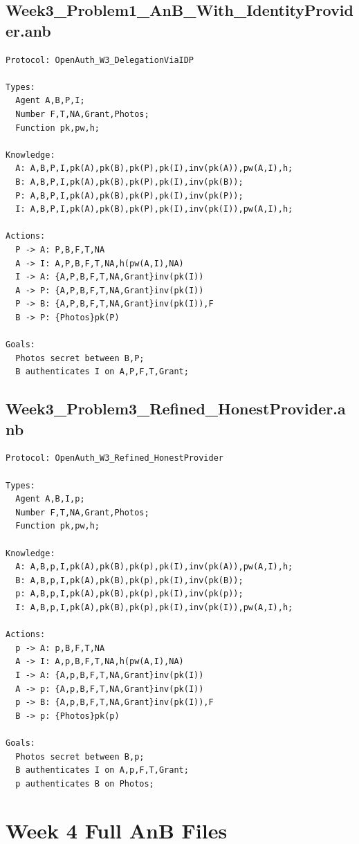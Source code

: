 \documentclass[11pt,a4paper]{article}
\begin{document}
\subsection{Week3\_Problem1\_AnB\_With\_IdentityProvider.anb}
\begin{lstlisting}[caption={Week 3 -- Initial IDP integration model},label={lst:week3-idp-full}]
Protocol: OpenAuth_W3_DelegationViaIDP

Types:
  Agent A,B,P,I;
  Number F,T,NA,Grant,Photos;
  Function pk,pw,h;

Knowledge:
  A: A,B,P,I,pk(A),pk(B),pk(P),pk(I),inv(pk(A)),pw(A,I),h;
  B: A,B,P,I,pk(A),pk(B),pk(P),pk(I),inv(pk(B));
  P: A,B,P,I,pk(A),pk(B),pk(P),pk(I),inv(pk(P));
  I: A,B,P,I,pk(A),pk(B),pk(P),pk(I),inv(pk(I)),pw(A,I),h;

Actions:
  P -> A: P,B,F,T,NA
  A -> I: A,P,B,F,T,NA,h(pw(A,I),NA)
  I -> A: {A,P,B,F,T,NA,Grant}inv(pk(I))
  A -> P: {A,P,B,F,T,NA,Grant}inv(pk(I))
  P -> B: {A,P,B,F,T,NA,Grant}inv(pk(I)),F
  B -> P: {Photos}pk(P)

Goals:
  Photos secret between B,P;
  B authenticates I on A,P,F,T,Grant;
\end{lstlisting}

\subsection{Week3\_Problem3\_Refined\_HonestProvider.anb}
\begin{lstlisting}[caption={Week 3 -- Refined honest-provider model},label={lst:week3-refined-full}]
Protocol: OpenAuth_W3_Refined_HonestProvider

Types:
  Agent A,B,I,p;
  Number F,T,NA,Grant,Photos;
  Function pk,pw,h;

Knowledge:
  A: A,B,p,I,pk(A),pk(B),pk(p),pk(I),inv(pk(A)),pw(A,I),h;
  B: A,B,p,I,pk(A),pk(B),pk(p),pk(I),inv(pk(B));
  p: A,B,p,I,pk(A),pk(B),pk(p),pk(I),inv(pk(p));
  I: A,B,p,I,pk(A),pk(B),pk(p),pk(I),inv(pk(I)),pw(A,I),h;

Actions:
  p -> A: p,B,F,T,NA
  A -> I: A,p,B,F,T,NA,h(pw(A,I),NA)
  I -> A: {A,p,B,F,T,NA,Grant}inv(pk(I))
  A -> p: {A,p,B,F,T,NA,Grant}inv(pk(I))
  p -> B: {A,p,B,F,T,NA,Grant}inv(pk(I)),F
  B -> p: {Photos}pk(p)

Goals:
  Photos secret between B,p;
  B authenticates I on A,p,F,T,Grant;
  p authenticates B on Photos;
\end{lstlisting}

\section{Week 4 Full AnB Files}
\end{document}
